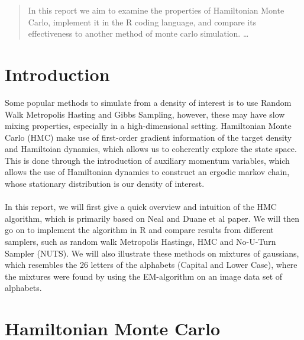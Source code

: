 \documentclass[11pt]{article}
\begin{document}
\maketitle

\begin{abstract}
In this report we aim to examine the properties of Hamiltonian Monte Carlo, implement it in the R coding language, and compare its effectiveness to another method of monte carlo simulation. \ldots
\end{abstract}
\newpage
\section{Introduction}
Some popular methods to simulate from a density of interest is to use Random Walk Metropolis Hasting and Gibbs Sampling, however, these may have slow mixing properties, especially in a high-dimensional setting. Hamiltonian Monte Carlo (HMC) make use of first-order gradient information of the target density and Hamiltoian dynamics, which allows us to coherently explore the state space. This is done through the introduction of auxiliary momentum variables, which allows the use of Hamiltonian dynamics to construct an ergodic markov chain, whose stationary distribution is our density of interest. 
\\
\\
In this report, we will first give a quick overview and intuition of the HMC algorithm, which is primarily based on Neal\cite{neal} and Duane et al\cite{duane} paper. We will then go on to implement the algorithm in R and compare results from different samplers, such as random walk Metropolis Hastings, HMC and No-U-Turn Sampler (NUTS). We will also illustrate these methods on mixtures of gaussians, which resembles the 26 letters of the alphabets (Capital and Lower Case), where the mixtures were found by using the EM-algorithm on an image data set of alphabets.
\section{Hamiltonian Monte Carlo}
\end{document}

